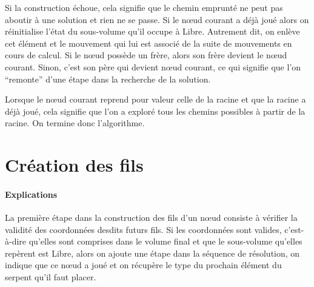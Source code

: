 Si la construction échoue, cela signifie que le chemin emprunté ne peut pas aboutir à une solution et rien ne se passe. Si le nœud courant a déjà joué alors on réinitialise l'état du sous-volume qu'il occupe à Libre. Autrement dit, on enlève cet élément et le mouvement qui lui est associé de la suite de mouvements en cours de calcul. Si le nœud possède un frère, alors son frère devient le nœud courant. Sinon, c'est son père qui devient nœud courant, ce qui signifie que l'on ``remonte'' d'une étape dans la recherche de la solution.

Lorsque le nœud courant reprend pour valeur celle de la racine et que la racine a déjà joué, cela signifie que l'on a exploré tous les chemins possibles à partir de la racine. On termine donc l'algorithme.

\newpage
\section{Création des fils}

\begin{algo}
 \VAR
 \ENDVAR
 \BEGIN
  \ELSE
  \ENDIF
  \ENDFOR
  \ENDIF
  \ELSE
  \ENDIF
 \END
\end{algo}

\paragraph{Explications} La première étape dans la construction des fils d'un nœud consiste à vérifier la validité des coordonnées desdits futurs fils. Si les coordonnées sont valides, c'est-à-dire qu'elles sont comprises dans le volume final et que le sous-volume qu'elles repèrent est Libre, alors on ajoute une étape dans la séquence de résolution, on indique que ce nœud a joué et on récupère le type du prochain élément du serpent qu'il faut placer.


